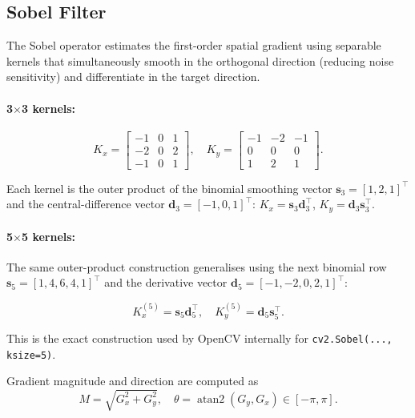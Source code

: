 \documentclass{article}
\begin{document}
\subsection{Sobel Filter}

The Sobel operator estimates the first-order spatial gradient using
separable kernels that simultaneously smooth in the orthogonal direction
(reducing noise sensitivity) and differentiate in the target direction.

\paragraph{3$\times$3 kernels:}
\begin{equation}
  K_x =
  \begin{bmatrix} -1 & 0 & 1 \\ -2 & 0 & 2 \\ -1 & 0 & 1 \end{bmatrix},
  \quad
  K_y =
  \begin{bmatrix} -1 & -2 & -1 \\ 0 & 0 & 0 \\ 1 & 2 & 1 \end{bmatrix}.
\end{equation}

Each kernel is the outer product of the binomial smoothing vector
$\mathbf{s}_3 = [1,2,1]^\top$ and the central-difference vector
$\mathbf{d}_3 = [-1,0,1]^\top$:
$K_x = \mathbf{s}_3 \mathbf{d}_3^\top$,
$K_y = \mathbf{d}_3 \mathbf{s}_3^\top$.

\paragraph{5$\times$5 kernels:}
The same outer-product construction generalises using the next binomial row
$\mathbf{s}_5 = [1,4,6,4,1]^\top$ and the derivative vector
$\mathbf{d}_5 = [-1,-2,0,2,1]^\top$:

\begin{equation}
  K_x^{(5)} = \mathbf{s}_5 \mathbf{d}_5^\top, \quad
  K_y^{(5)} = \mathbf{d}_5 \mathbf{s}_5^\top.
  \label{eq:sobel5}
\end{equation}

This is the exact construction used by OpenCV internally for
\texttt{cv2.Sobel(..., ksize=5)}.

Gradient magnitude and direction are computed as
\begin{equation}
  M = \sqrt{G_x^2 + G_y^2}, \quad
  \theta = \operatorname{atan2}(G_y, G_x) \in [-\pi, \pi].
  \label{eq:sobelmag}
\end{equation}
\end{document}
